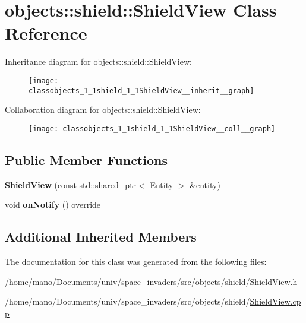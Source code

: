 \hypertarget{classobjects_1_1shield_1_1ShieldView}{}\section{objects\+:\+:shield\+:\+:Shield\+View Class Reference}
\label{classobjects_1_1shield_1_1ShieldView}


Inheritance diagram for objects\+:\+:shield\+:\+:Shield\+View\+:\nopagebreak
\begin{figure}[H]
\begin{center}
\leavevmode
\texttt{[image: classobjects\_1\_1shield\_1\_1ShieldView\_\_inherit\_\_graph]}
\end{center}
\end{figure}


Collaboration diagram for objects\+:\+:shield\+:\+:Shield\+View\+:\nopagebreak
\begin{figure}[H]
\begin{center}
\leavevmode
\texttt{[image: classobjects\_1\_1shield\_1\_1ShieldView\_\_coll\_\_graph]}
\end{center}
\end{figure}
\subsection*{Public Member Functions}
\begin{DoxyCompactItemize}
\item 
\mbox{\label{classobjects_1_1shield_1_1ShieldView_ac2f9dbbdc6efd8a3453576c83d62a8fe}}
{\bfseries Shield\+View} (const std\+::shared\+\_\+ptr$<$ \hyperlink{classobjects_1_1Entity}{Entity} $>$ \&entity)
\item 
\mbox{\label{classobjects_1_1shield_1_1ShieldView_ab1646d34b45e9007c12fbf03b81222f2}}
void {\bfseries on\+Notify} () override
\end{DoxyCompactItemize}
\subsection*{Additional Inherited Members}


The documentation for this class was generated from the following files\+:\begin{DoxyCompactItemize}
\item 
/home/mano/\+Documents/univ/space\+\_\+invaders/src/objects/shield/\hyperlink{ShieldView_8h}{Shield\+View.\+h}\item
/home/mano/\+Documents/univ/space\+\_\+invaders/src/objects/shield/\hyperlink{ShieldView_8cpp}{Shield\+View.\+cpp}\end{DoxyCompactItemize}
